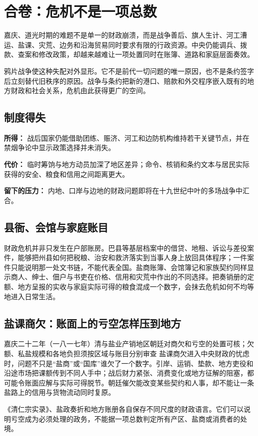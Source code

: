 \section{合卷：危机不是一项总数}

嘉庆、道光时期的难题不是单一的财政崩溃，而是战争善后、旗人生计、河工漕运、盐课、灾荒、边务和沿海贸易同时要求有限的行政资源。中央仍能调兵、拨款、查案和修改政策，却越来越难让一项处置同时在账簿、道路和家庭层面奏效。

鸦片战争使这种失配对外显形。它不是前代一切问题的唯一原因，也不是条约签字后立刻替代旧秩序的原因。战争与条约把新的港口、赔款和外交程序嵌入既有的地方财政和社会关系，危机由此获得更广的空间。

\subsection{制度得失}

\textbf{所得：} 战后国家仍能借助团练、赈济、河工和边防机构维持若干关键节点，并在禁烟争论中显示政策选择并未消失。

\textbf{代价：} 临时筹饷与地方动员加深了地区差异；命令、核销和条约文本与居民实际获得的安全、粮食和信用之间距离更大。

\textbf{留下的压力：} 内地、口岸与边地的财政问题即将在十九世纪中叶的多场战争中汇合。

\subsection{县衙、会馆与家庭账目}

财政危机并非只发生在户部账房。巴县等基层档案中的借贷、地租、诉讼与差役案件，能够把州县如何把税粮、治安和救济落实到当事人身上放回具体程序；一件案件只能说明那一处文书链，不能代表全国。盐商账簿、会馆簿记和家族契约同样显示商人、绅士、佃户与书吏在价格、信用和灾荒中作出的不同选择。把奏销册的定额、地方呈报的实收与家庭实际可得的粮食混成一个数字，会抹去危机如何不均等地进入日常生活。

\subsection{盐课商欠：账面上的亏空怎样压到地方}
\begin{event}{}{嘉庆二十二年（一八一七年）}{清与盐业产销地区}{朝廷对商欠和亏空的处置可核；欠额、私盐规模和各地负担须按区域与账目分别审查}
盐课商欠进入中央财政的忧虑时，问题不只是“盐商”或“国库”谁欠了一个数字。引岸、运销、垫款、地方吏役和沿途市场把课额传到不同人手中；战后财力紧张、消费变化或地方征解的阻塞，都可能令账面应解与实际可得脱节。朝廷催欠能改变某些契约和人事，却不能让一条盐路上的信用与货物流动同时复原。

《清仁宗实录》、盐政奏折和地方账册各自保存不同尺度的财政语言。它们可以说明亏空成为必须处理的政务，不能据一项总数判定所有产区、盐商或消费者的处境。
\end{event}